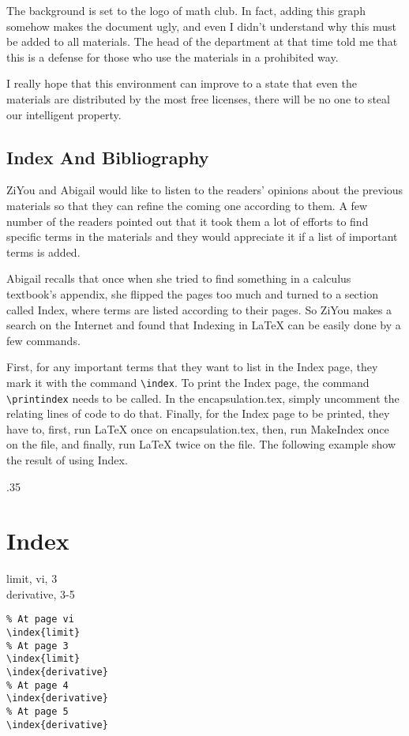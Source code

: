 The background is set to the logo of math club. In fact, adding this graph somehow makes the document ugly, and even I didn't understand why this must be added to all materials. The head of the department at that time told me that this is a defense for those who use the materials in a prohibited way.

I really hope that this environment can improve to a state that even the materials are distributed by the most free licenses, there will be no one to steal our intelligent property.

\subsection{Index And Bibliography}
ZiYou and Abigail would like to listen to the readers' opinions about the previous materials so that they can refine the coming one according to them. A few number of the readers pointed out that it took them a lot of efforts to find specific terms in the materials and they would appreciate it if a list of important terms is added.

Abigail recalls that once when she tried to find something in a calculus textbook's appendix, she flipped the pages too much and turned to a section called Index, where terms are listed according to their pages. So ZiYou makes a search on the Internet and found that Indexing in \LaTeX{} can be easily done by a few commands.

First, for any important terms that they want to list in the Index page, they mark it with the command \verb=\index=. To print the Index page, the command \verb=\printindex= needs to be called. In the encapsulation.tex, simply uncomment the relating lines of code to do that. Finally, for the Index page to be printed, they have to, first, run \LaTeX{} once on encapsulation.tex, then, run MakeIndex once on the file, and finally, run \LaTeX{} twice on the file. The following example show the result of using Index.
\begin{miniexammar}{.35\textandmarginlen}{
\section*{Index}
limit, vi, 3\\
derivative, 3-5
}
\begin{lstlisting}
% At page vi
\index{limit}
% At page 3
\index{limit}
\index{derivative}
% At page 4
\index{derivative}
% At page 5
\index{derivative}
\end{lstlisting}
\end{miniexammar}

